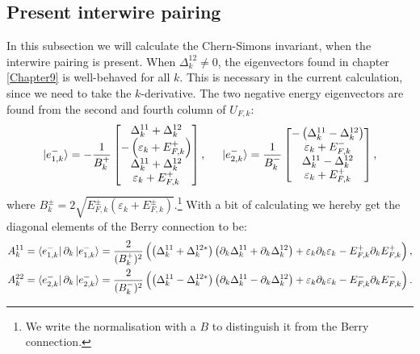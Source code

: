 \subsection{Present interwire pairing}
\label{subsec.2wires_CSinvDelta12neq0}
In this subsection we will calculate the Chern-Simons invariant, when the interwire pairing is present. When $\Delta^{12}_k \neq 0$, the eigenvectors found in chapter \ref{Chapter9} is well-behaved for all $k$. This is necessary in the current calculation, since we need to take the $k$-derivative. The two negative energy eigenvectors are found from the second and fourth column of $U_{F,k}$:
\begin{equation}
\ket{e^{-}_{1,k}} = - \frac{1}{ B^{+}_k }\begin{bmatrix} \Delta^{11}_k + \Delta^{12}_k \\ - \left(\varepsilon_k + E^{+}_{F,k}\right) \\ \Delta^{11}_k + \Delta^{12}_k \\ \varepsilon_k + E^{+}_{F,k} \end{bmatrix}, \hspace{0.5cm} \ket{e^{-}_{2,k}} = \frac{1}{ B^{-}_k }\begin{bmatrix} -\left(\Delta^{11}_k - \Delta^{12}_k\right) \\ \varepsilon_k + E^{-}_{F,k} \\ \Delta^{11}_k - \Delta^{12}_k \\ \varepsilon_k + E^{+}_{F,k} \end{bmatrix}, \nonumber 
\end{equation}
where $B^{\pm}_k = 2\sqrt{E^{\pm}_{F,k}\left(\varepsilon_k + E^{\pm}_{F,k}\right) }$.\footnote{We write the normalisation with a $B$ to distinguish it from the Berry connection.} With a bit of calculating we hereby get the diagonal elements of the Berry connection to be:
\begin{align}
A^{11}_k &= \bra{e^{-}_{1,k}}\partial_k\ket{e^{-}_{1,k}} = \frac{2}{(B^{+}_k)^2}\left(\left(\Delta^{11}_k + \Delta^{12*}_k \right) \left(\partial_k\Delta^{11}_k + \partial_k\Delta^{12}_k \right) + \varepsilon_k\partial_k\varepsilon_k - E^{+}_{F,k}\partial_k E^{+}_{F,k}\right), \nonumber \\
A^{22}_k &= \bra{e^{-}_{2,k}}\partial_k\ket{e^{-}_{2,k}} = \frac{2}{(B^{-}_k)^2}\left(\left(\Delta^{11}_k - \Delta^{12*}_k \right) \left(\partial_k\Delta^{11}_k - \partial_k\Delta^{12}_k \right) + \varepsilon_k\partial_k\varepsilon_k - E^{-}_{F,k}\partial_k E^{-}_{F,k}\right). \nonumber
\end{align}
